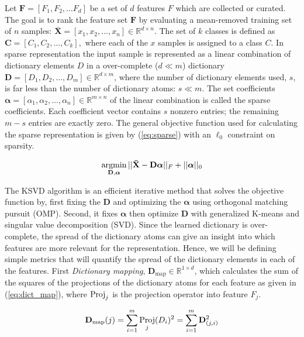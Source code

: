     
    
    
    
    
    Let $\mathbf{F} = [F_1, F_2, \dots F_d]$ be a set of $d$ features $F$ which are collected or curated. The goal is to rank the feature set $\mathbf{F}$ by evaluating a mean-removed training set of $n$ samples: $\mathbf{\bar{X}} = [x_1, x_2, \dots, x_n] \in \mathbb{R}^{d \times n}$. The set of $k$ classes is defined as $\mathbf{C} = [C_1, C_2, \dots, C_k],$ where each of the $x$ samples is assigned to a class $C$. In sparse representation the input sample is represented as a linear combination of dictionary elements $D$ in a over-complete ($d \ll m$) dictionary $\mathbf{D} = [D_1, D_2, \dots, D_m] \in \mathbb{R}^{d \times m}$, where the number of dictionary elements used, $s$, is far less than the number of dictionary atoms: $s \ll m$. The set coefficients $\bm{\alpha} = [\alpha_1, \alpha_2, \dots, \alpha_n] \in \mathbb{R}^{m \times n}$ of the linear combination is called the sparse coefficients. Each coefficient vector contains $s$ nonzero entries; the remaining $m-s$ entries are exactly zero. The general objective function used for calculating the sparse representation is given by (\ref{eq:sparse}) with an $\ell_0$ constraint on sparsity.
    
    \begin{equation}
        \label{eq:sparse}
        \operatorname*{argmin}_{\mathbf{D},\bm{\alpha}} ||\mathbf{\bar{X}}- \mathbf{D}\bm{\alpha}||_F + ||\bm{\alpha}||_0
    \end{equation}
    
    The KSVD algorithm is an efficient iterative method that solves the objective function by, first fixing the $\mathbf{D}$ and optimizing the $\bm{\alpha}$ using orthogonal matching pursuit (OMP)\cite{Pati1993}. Second, it fixes $\bm{\alpha}$ then optimize $\mathbf{D}$ with generalized K-means and singular value decomposition (SVD). Since the learned dictionary is over-complete, the spread of the dictionary atoms can give an insight into which features are more relevant for the representation. Hence, we will be defining simple metrics that will quantify the spread of the dictionary elements in each of the features. First \textit{Dictionary mapping}, $\mathbf{D}_\textrm{map} \in \mathbb{R}^{1 \times d}$, which calculates the sum of the squares of the projections of the dictionary atoms for each feature as given in (\ref{eq:dict_map}), where $\operatorname*{Proj}_j$ is the projection operator into feature $F_j$. 
    
    \begin{equation}
        \label{eq:dict_map}
        \mathbf{D}_\textrm{map}(j)= \sum_{i=1}^m \operatorname*{Proj}_j(D_i)^2  = \sum_{i=1}^m \mathbf{D}_{(j,i)}^2 
    \end{equation}
    
